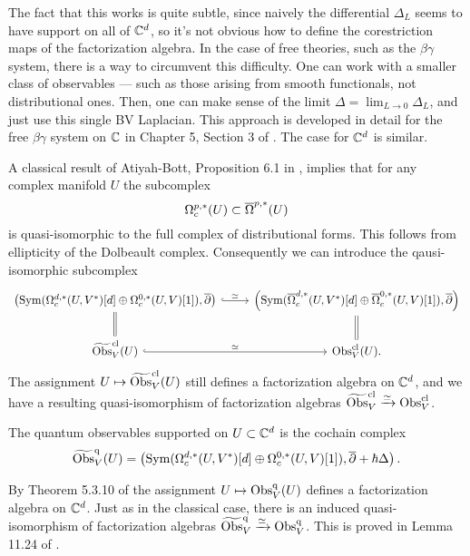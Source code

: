 The fact that this works is quite subtle, since naively the differential $\Delta_L$ seems to have support on all of $\CC^d$, so it's not obvious how to define the corestriction maps of the factorization algebra. 
In the case of free theories, such as the $\beta\gamma$ system, there is a way to circumvent this difficulty. 
One can work with a smaller class of observables --- such as those arising from smooth functionals, not distributional ones.
Then, one can make sense of the limit $\Delta = \lim_{L \to 0} \Delta_L$, and just use this single BV Laplacian. 
This approach is developed in detail for the free $\beta\gamma$ system on $\CC$ in Chapter 5, Section 3 of \cite{CG1}. 
The case for $\CC^d$ is similar. 

A classical result of Atiyah-Bott, Proposition 6.1 in \cite{AB}, implies that for any complex manifold $U$ the subcomplex
\[
\Omega^{p,*}_c(U) \subset \Bar{\Omega}^{p,*}(U)
\]
is quasi-isomorphic to the full complex of distributional forms. 
This follows from ellipticity of the Dolbeault complex.
Consequently we can introduce the qausi-isomorphic subcomplex 
\[
\begin{tikzcd}    
 \left(\Sym(\Omega^{d,*}_c(U,V^*)[d] \oplus \Omega^{0,*}_c(U,V)[1]), \dbar\right) \arrow[hook]{r}{\simeq} & \left(\Sym(\Bar{\Omega}^{d,*}_c(U,V^*)[d] \oplus \Bar{\Omega}^{0,*}_c(U,V)[1]), \dbar \right) \\ \Tilde{\Obs}^{\cl}_V(U) \arrow[equals]{u} \arrow[hook]{r}{\simeq} & \Obs_V^{\cl}(U)  \arrow[equals]{u} .
\end{tikzcd}
\]
The assignment $U \mapsto \Tilde{\Obs}^{\cl}_V(U)$ still defines a factorization algebra on $\CC^d$, and we have a resulting quasi-isomorphism of factorization algebras $\Tilde{\Obs}^{\cl}_V \xto{\simeq} \Obs^{\cl}_V$.


\begin{dfn}
The quantum observables supported on $U \subset \CC^d$ is the cochain complex
\[
\Tilde{\Obs}^\q_V(U) = \left(\Sym(\Omega^{d,*}_c(U,V^*)[d] \oplus \Omega^{0,*}_c(U,V)[1]), \dbar + \hbar \Delta\right) .
\]
\end{dfn}

By Theorem 5.3.10 of \cite{GwThesis} the assignment $U \mapsto \Obs^\q_V(U)$ defines a factorization algebra on $\CC^d$. 
Just as in the classical case, there is an induced quasi-isomorphism of factorization algebras $\Tilde{\Obs}^\q_{V} \xto{\simeq} \Obs^\q_V$. 
This is proved in Lemma 11.24 of \cite{GGW}. 

